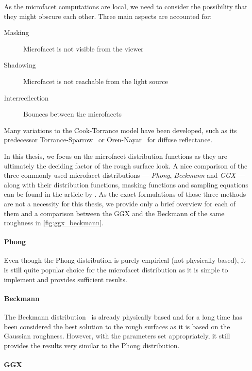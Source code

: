 As the microfacet computations are local, we need to consider the possibility that they might obscure each other. Three main aspects are accounted for:
\begin{description}
	\item[Masking] Microfacet is not visible from the viewer
	\item[Shadowing] Microfacet is not reachable from the light source
	\item[Interrecflection] Bounces between the microfacets
\end{description}

Many variations to the Cook-Torrance model have been developed, such as its predecessor Torrance-Sparrow~\cite{Torrance1967TheoryFO} or Oren-Nayar~\cite{oren1994generalization} for diffuse reflectance.

In this thesis, we focus on the microfacet distribution functions as they are ultimately the deciding factor of the rough surface look. A nice comparison of the three commonly used microfacet distributions --- \emph{Phong}, \emph{Beckmann} and \emph{GGX} --- along with their distribution functions, masking functions and sampling equations can be found in the article by \citet{walter2007microfacet}. As the exact formulations of those three methods are not a necessity for this thesis, we provide only a brief overview for each of them and a comparison between the GGX and the Beckmann of the same roughness in 
\autoref{fig:ggx_beckmann}.

\paragraph{Phong}

Even though the Phong distribution is purely empirical (not physically based), it is still quite popular choice for the microfacet distribution as it is simple to implement and provides sufficient results.

\paragraph{Beckmann}

The Beckmann distribution~\cite{beckmann1987scattering} is already physically based and for a long time has been considered the best solution to the rough surfaces as it is based on the Gaussian roughness. However, with the parameters set appropriately, it still provides the results very similar to the Phong distribution.

\paragraph{GGX}

